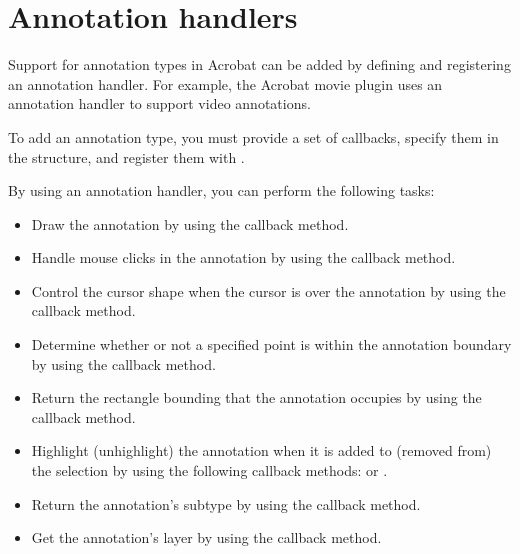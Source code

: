 \documentclass[letterpaper,12pt,english,openany,oneside]{sphinxmanual}
\begin{document}
\section{Annotation handlers}
\label{\detokenize{Plugins_Handlers:annotation-handlers}}
Support for annotation types in Acrobat can be added by defining and registering an annotation handler. For example, the Acrobat movie plugin uses an annotation handler to support video annotations.

To add an annotation type, you must provide a set of callbacks, specify them in the  structure, and register them with .

By using an annotation handler, you can perform the following tasks:
\begin{itemize}
\item {} 
Draw the annotation by using the  callback method.

\item {} 
Handle mouse clicks in the annotation by using the  callback method.

\item {} 
Control the cursor shape when the cursor is over the annotation by using the  callback method.

\item {} 
Determine whether or not a specified point is within the annotation boundary by using the  callback method.

\item {} 
Return the rectangle bounding that the annotation occupies by using the  callback method.

\item {} 
Highlight (unhighlight) the annotation when it is added to (removed from) the selection by using the following callback methods:  or .

\item {} 
Return the annotation’s subtype by using the  callback method.

\item {} 
Get the annotation’s layer by using the  callback method.

\end{itemize}
\end{document}
